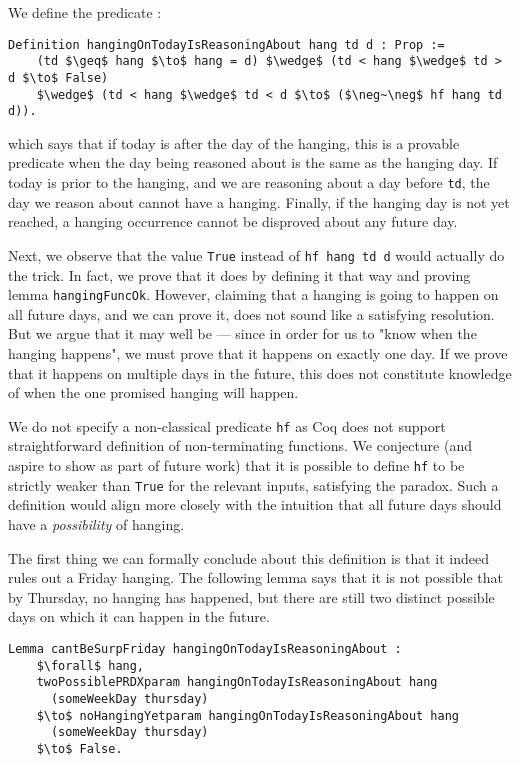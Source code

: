 \documentclass[runningheads]{llncs}
\begin{document}
We define the predicate :

\begin{lstlisting}[mathescape=true]
  Definition hangingOnTodayIsReasoningAbout hang td d : Prop :=
    (td $\geq$ hang $\to$ hang = d) $\wedge$ (td < hang $\wedge$ td > d $\to$ False)
    $\wedge$ (td < hang $\wedge$ td < d $\to$ ($\neg~\neg$ hf hang td d)).
\end{lstlisting}

which says that if today is after the day of the hanging, this is a provable predicate when the
day being reasoned about is the same as the hanging day. If today is prior to the hanging, and
we are reasoning about a day before {\tt td}, the day we reason about cannot have a hanging.
Finally, if the hanging day is not
yet reached, a hanging occurrence cannot be disproved about any future day.

Next, we observe that the value {\tt True} instead of {\tt hf hang td d} would
actually do the trick. In fact, we prove that it does by defining it that
way and proving lemma {\tt hangingFuncOk}. However, claiming that a hanging is going to happen
on all future days, and we can prove it, does not sound like a satisfying
resolution. But we argue that it may well be --- since in order for us to
"know when the hanging happens", we must prove that it happens on exactly one day.
If we prove that it happens on multiple days in the future, this does not
constitute knowledge of when the one promised hanging will happen.

We do not specify a non-classical predicate {\tt hf} as Coq does not support
straightforward definition of non-terminating functions.
We conjecture (and aspire to show as part of future work) that it is possible to
define {\tt hf} to be strictly weaker than {\tt True} for the relevant inputs,
satisfying the paradox. Such a definition would align more closely with
the intuition that all future days should have a \emph{possibility} of hanging.

The first thing we can formally conclude about this definition is that it indeed rules out
a Friday hanging. The following lemma says that it is not possible that by Thursday,
no hanging has happened, but there are still two distinct possible days on which it can
happen in the future.

\begin{lstlisting}[mathescape=true]
  Lemma cantBeSurpFriday hangingOnTodayIsReasoningAbout :
    $\forall$ hang,
    twoPossiblePRDXparam hangingOnTodayIsReasoningAbout hang
      (someWeekDay thursday)
    $\to$ noHangingYetparam hangingOnTodayIsReasoningAbout hang
      (someWeekDay thursday)
    $\to$ False.
\end{lstlisting}
\end{document}
